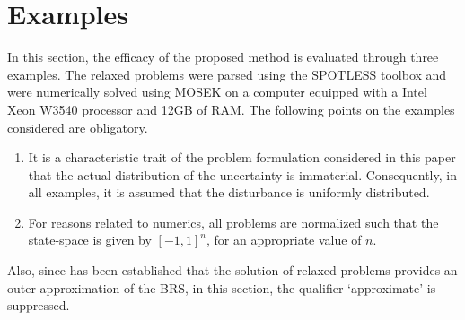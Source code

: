   \section{Examples}
\label{sec:examples}
  In this section, the efficacy of the proposed method is evaluated through three examples. The relaxed problems were parsed using the SPOTLESS toolbox and were numerically solved using MOSEK on a computer equipped with a Intel Xeon W3540 processor and 12GB of RAM.
  The following points on the examples considered are obligatory.
  \begin{enumerate}
    \item It is a characteristic trait of the problem formulation considered in this paper that the actual distribution of the uncertainty is immaterial. Consequently, in all examples, it is assumed that the disturbance is uniformly distributed.
    \item For reasons related to numerics, all problems are normalized such that the state-space is given by $[-1,1]^n$, for an appropriate value of $n$.
  \end{enumerate}
  Also, since has been established that the solution of relaxed problems provides an outer approximation of the BRS, in this section, the qualifier `approximate' is suppressed.
